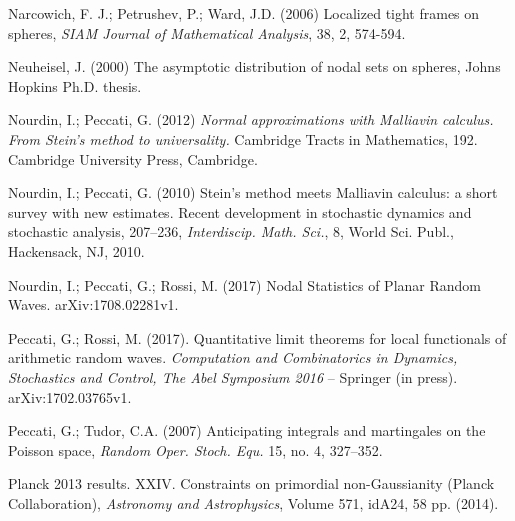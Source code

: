 \begin{thebibliography}{99}
	 Narcowich, F. J.; Petrushev, P.; Ward, J.D. (2006) Localized tight frames on spheres, \textit{SIAM Journal of Mathematical Analysis}, 38, 2, 574-594.
	
	
	
	 Neuheisel, J. (2000) The asymptotic distribution of nodal sets on spheres, Johns Hopkins
	Ph.D. thesis.
	
	 Nourdin, I.; Peccati, G. (2012) \textit{Normal approximations with Malliavin calculus. From Stein's method to universality.} Cambridge Tracts in Mathematics, 192. Cambridge University Press, Cambridge. 
	
	 Nourdin, I.; Peccati, G. (2010) Stein's method meets Malliavin calculus: a short survey with new estimates. Recent development in stochastic dynamics and stochastic analysis, 207–236, \textit{Interdiscip. Math. Sci.}, 8, World Sci. Publ., Hackensack, NJ, 2010.
	
	 Nourdin, I.; Peccati, G.; Rossi, M. (2017) Nodal Statistics of
	Planar Random Waves. arXiv:1708.02281v1.
	
	
	
	
	
	
	
	
	
	
	 Peccati, G.; Rossi, M. (2017). Quantitative limit theorems for local functionals of arithmetic random waves. \textit{Computation and Combinatorics in Dynamics, Stochastics and Control, The Abel Symposium 2016} – Springer (in press).  arXiv:1702.03765v1.
	
	Peccati, G.; Tudor, C.A. (2007) Anticipating integrals and martingales on the Poisson space, \textit{Random Oper. Stoch. Equ.} 15, no. 4, 327–352. 
	
	
	 Planck 2013 results. XXIV. Constraints on primordial non-Gaussianity (Planck Collaboration), \textit{Astronomy and Astrophysics},  Volume 571, idA24, 58 pp. (2014).
	

\end{thebibliography}
